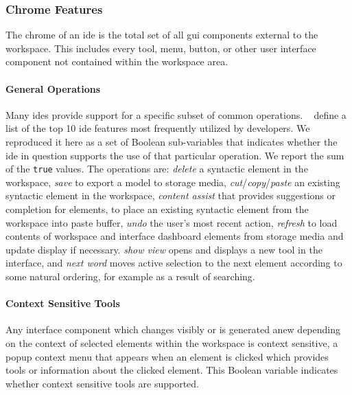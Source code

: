 \subsubsection{Chrome Features} \label{subsubsec:chrome}

The chrome of an \ac{ide} is the total set of all \acf{gui} components
external to the workspace. This includes every tool, menu, button, or other
user interface component not contained within the workspace area.


\paragraph{General Operations}
Many \acp{ide} provide support for a specific subset of common operations.
\citeauthor{murphy2006}~\cite{murphy2006} define a list of the top 10 \ac{ide} features most frequently utilized by developers.
We reproduced it here as a set of Boolean sub-variables that indicates whether the \ac{ide} in question supports the use of that particular operation.
We report the sum of the \texttt{true} values.
The operations are: \emph{delete} a syntactic element in the workspace,
\emph{save} to export a model to storage media,
\emph{cut}/\emph{copy}/\emph{paste} an existing syntactic element in the workspace,
\emph{content assist} that provides suggestions or completion for elements,
 to place an existing syntactic element from the workspace into paste buffer,
\emph{undo} the user's most recent action,
\emph{refresh} to load contents of workspace and interface dashboard elements from storage media and update display if necessary.
\emph{show view} opens and displays a new tool in the interface,
and
\emph{next word} moves active selection to the next element according to some natural ordering, for example as a result of searching.


\paragraph{Context Sensitive Tools}
Any interface component which changes visibly or is generated anew
depending on the context of selected elements within the workspace is
context sensitive, \eg a popup context menu that appears when an element is
clicked which provides tools or information about the clicked element.
This Boolean variable indicates whether context sensitive tools are
supported.
 


